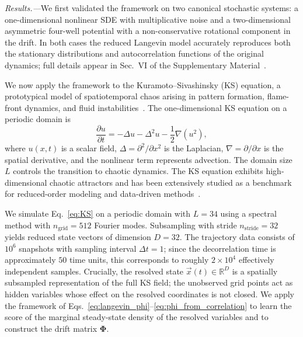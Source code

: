 \documentclass[%
  prl,
  reprint,
  amsmath,
  amssymb,
  aps
]{revtex4-2}
\newcommand{\vvec}[1]{\vec{#1}}
\begin{document}
\textit{Results.---}We first validated the framework on two canonical stochastic systems: a one-dimensional nonlinear SDE with multiplicative noise and a two-dimensional asymmetric four-well potential with a non-conservative rotational component in the drift. In both cases the reduced Langevin model accurately reproduces both the stationary distributions and autocorrelation functions of the original dynamics; full details appear in Sec.~VI of the Supplementary Material~\cite{SM}.

We now apply the framework to the Kuramoto--Sivashinsky (KS) equation, a prototypical model of spatiotemporal chaos arising in pattern formation, flame-front dynamics, and fluid instabilities~\cite{kuramoto1978diffusion,sivashinsky1977nonlinear}. The one-dimensional KS equation on a periodic domain is
\begin{equation}
\label{eq:KS}
\frac{\partial u}{\partial t} = -\Delta u - \Delta^2 u - \frac{1}{2}\nabla\!\left(u^2\right),
\end{equation}
where $u(x,t)$ is a scalar field, $\Delta = \partial^2/\partial x^2$ is the Laplacian, $\nabla = \partial/\partial x$ is the spatial derivative, and the nonlinear term represents advection. The domain size $L$ controls the transition to chaotic dynamics. The KS equation exhibits high-dimensional chaotic attractors and has been extensively studied as a benchmark for reduced-order modeling and data-driven methods~\cite{CvitanovicDavidchackSiminos2010, LuLinChorin2017}.

We simulate Eq.~\eqref{eq:KS} on a periodic domain with $L=34$ using a spectral method with $n_{\text{grid}}=512$ Fourier modes. Subsampling with stride $n_{\text{stride}}=32$ yields reduced state vectors of dimension $D=32$. The trajectory data consists of $10^6$ snapshots with sampling interval $\Delta t = 1$; since the decorrelation time is approximately $50$ time units, this corresponds to roughly $2\times 10^4$ effectively independent samples. Crucially, the resolved state $\vvec{x}(t)\in\mathbb{R}^D$ is a spatially subsampled representation of the full KS field; the unobserved grid points act as hidden variables whose effect on the resolved coordinates is not closed. We apply the framework of Eqs.~\eqref{eq:langevin_phi}--\eqref{eq:phi_from_correlation} to learn the score of the marginal steady-state density of the resolved variables and to construct the drift matrix $\bm{\Phi}$.
\end{document}
